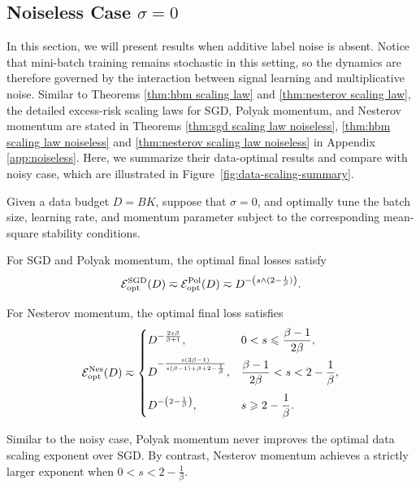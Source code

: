 \documentclass[11pt]{article}
\begin{document}
\subsection{Noiseless Case \texorpdfstring{\(\sigma=0\)}{sigma = 0}}
In this section, we will present results when additive label noise is absent. Notice that mini-batch training remains stochastic in this setting, so the dynamics are therefore governed by the interaction between signal learning and multiplicative noise. Similar to Theorems \ref{thm:hbm scaling law} and \ref{thm:nesterov scaling law}, the detailed excess-risk scaling laws for SGD, Polyak momentum, and Nesterov momentum are stated in Theorems \ref{thm:sgd scaling law noiseless}, \ref{thm:hbm scaling law noiseless} and \ref{thm:nesterov scaling law noiseless} in Appendix \ref{app:noiseless}. Here, we summarize their data-optimal results and compare with noisy case, which are illustrated in Figure~\ref{fig:data-scaling-summary}.

\begin{theorem}
\label{thm:noiseless-data-optimal-scaling}
Given a data budget \(D=BK\), suppose that \(\sigma=0\), and optimally tune the batch size, learning rate, and momentum parameter subject to the corresponding mean-square stability conditions.

For SGD and Polyak momentum, the optimal final losses satisfy
\begin{equation}
\label{eq:noiseless-sgd-polyak-optimal-rate}
\mathcal{E}_{\rm opt}^{\rm SGD}(D)
\eqsim
\mathcal{E}_{\rm opt}^{\rm Pol}(D)
\eqsim
D^{-\left(s\wedge(2-\frac{1}{\beta})\right)}.
\end{equation}

For Nesterov momentum, the optimal final loss satisfies
\begin{equation}
\label{eq:noiseless-nesterov-optimal-rate}
\mathcal{E}_{\rm opt}^{\rm Nes}(D)
\eqsim
\begin{cases}
D^{-\frac{2s\beta}{\beta+1}},
&
0<s\leqslant \dfrac{\beta-1}{2\beta},
\\[8pt]
D^{-\frac{s(3\beta-1)}
{s(\beta-1)+\beta+2-\frac{1}{\beta}}},
&
\dfrac{\beta-1}{2\beta}
<s<
2-\dfrac{1}{\beta},
\\[12pt]
D^{-\left(2-\frac{1}{\beta}\right)},
&
s\geqslant 2-\dfrac{1}{\beta}.
\end{cases}
\end{equation}
\end{theorem}

Similar to the noisy case, Polyak momentum never improves the optimal data scaling exponent over SGD. By contrast, Nesterov momentum achieves a strictly larger exponent when \(0<s<2-\frac{1}{\beta}.\)
\end{document}
